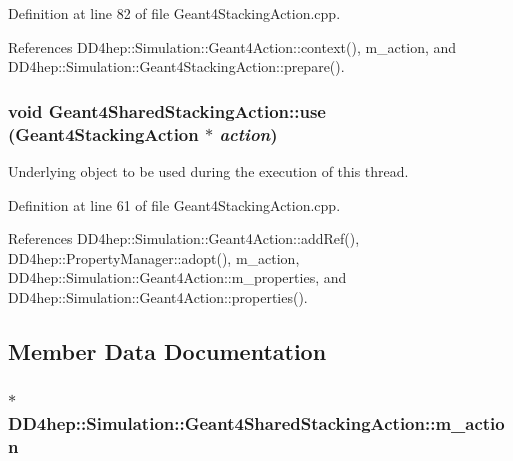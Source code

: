 Definition at line 82 of file Geant4StackingAction.cpp.

References DD4hep::Simulation::Geant4Action::context(), m\_\-action, and DD4hep::Simulation::Geant4StackingAction::prepare().\hypertarget{class_d_d4hep_1_1_simulation_1_1_geant4_shared_stacking_action_a8201cb5679ace2713e6a34ebe1282dbf}{
\subsubsection[{use}]{\setlength{\rightskip}{0pt plus 5cm}void Geant4SharedStackingAction::use ({\bf Geant4StackingAction} $\ast$ {\em action})}}
\label{class_d_d4hep_1_1_simulation_1_1_geant4_shared_stacking_action_a8201cb5679ace2713e6a34ebe1282dbf}


Underlying object to be used during the execution of this thread. 

Definition at line 61 of file Geant4StackingAction.cpp.

References DD4hep::Simulation::Geant4Action::addRef(), DD4hep::PropertyManager::adopt(), m\_\-action, DD4hep::Simulation::Geant4Action::m\_\-properties, and DD4hep::Simulation::Geant4Action::properties().

\subsection{Member Data Documentation}
\hypertarget{class_d_d4hep_1_1_simulation_1_1_geant4_shared_stacking_action_a3f3be5f46d2ee56467337edf438fc153}{
\subsubsection[{m\_\-action}]{$\ast$ {\bf DD4hep::Simulation::Geant4SharedStackingAction::m\_\-action}}}
\label{class_d_d4hep_1_1_simulation_1_1_geant4_shared_stacking_action_a3f3be5f46d2ee56467337edf438fc153}


